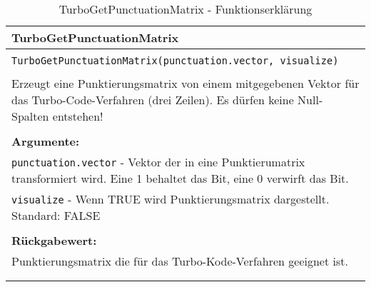 \begin{longtable}{|p{\textwidth}|}
\hline
\rowcolor{lightblue}TurboGetPunctuationMatrix\\
\hline
\\
\texttt{TurboGetPunctuationMatrix(punctuation.vector, visualize)}\\
\\
Erzeugt eine Punktierungsmatrix von einem mitgegebenen Vektor für das Turbo-Code-Verfahren (drei Zeilen). Es dürfen keine Null-Spalten entstehen!\\
\\
\textbf{Argumente:}\\
\texttt{punctuation.vector} - Vektor der in eine Punktierumatrix transformiert wird. Eine 1 behaltet das Bit, eine 0 verwirft das Bit.\\
\texttt{visualize} - Wenn TRUE wird Punktierungsmatrix dargestellt. Standard: FALSE\\
\\
\textbf{Rückgabewert:}\\
Punktierungsmatrix die für das Turbo-Kode-Verfahren geeignet ist.\\
\\
\hline
\caption{TurboGetPunctuationMatrix - Funktionserklärung}
\end{longtable}